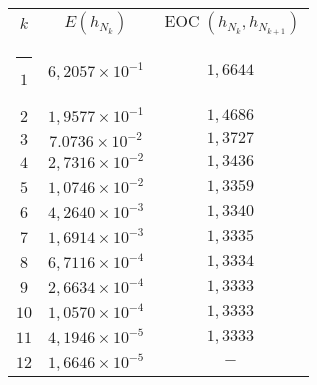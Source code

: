 \documentclass[]{scrartcl}
\makeatletter
\newcommand{\thickhline}{%
    \noalign {\ifnum 0=`}\fi \hrule height 1pt
    \futurelet \reserved@a \@xhline
}
\makeatother
\begin{document}
 	\begin{tabular}{|c|c|c|}\hline
 	$k$  & $E(h_{N_k})$ & $\operatorname{EOC}(h_{N_k},h_{N_{k+1}})$\\\thickhline
 	$1$  & $6,2057\times10^{-1}$ & $1,6644$\\\hline
 	$2$  & $1,9577\times10^{-1}$ & $1,4686$\\\hline
 	$3$  & $7.0736\times10^{-2}$ & $1,3727$\\\hline
 	$4$  & $2,7316\times10^{-2}$ & $1,3436$\\\hline
 	$5$  & $1,0746\times10^{-2}$ & $1,3359$\\\hline
 	$6$  & $4,2640\times10^{-3}$ & $1,3340$\\\hline
 	$7$  & $1,6914\times10^{-3}$ & $1,3335$\\\hline
 	$8$  & $6,7116\times10^{-4}$ & $1,3334$\\\hline
 	$9$  & $2,6634\times10^{-4}$ & $1,3333$\\\hline
 	$10$ & $1,0570\times10^{-4}$ & $1,3333$\\\hline
 	$11$ & $4,1946\times10^{-5}$ & $1,3333$\\\hline
 	$12$ & $1,6646\times10^{-5}$ & $-$\\\hline
 	\end{tabular}
 	
\end{document}
